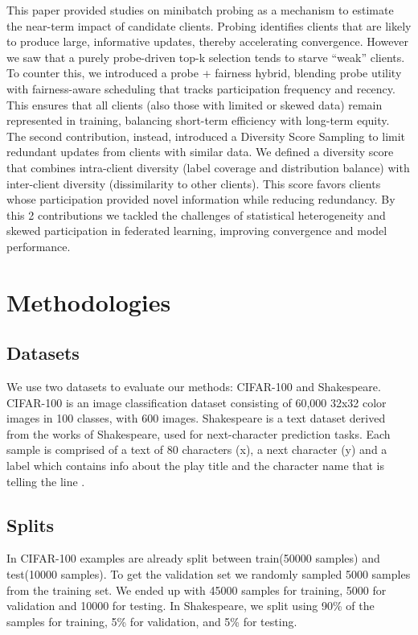\documentclass[10pt,twocolumn,letterpaper]{article}
\begin{document}
This paper provided studies on minibatch probing as a mechanism to estimate the near-term impact of candidate clients. Probing identifies clients that are likely to produce large, informative updates, thereby accelerating convergence. However we saw that a purely probe-driven top-k selection tends to starve “weak” clients. To counter this, we introduced a probe + fairness hybrid, blending probe utility with fairness-aware scheduling that tracks participation frequency and recency. This ensures that all clients (also those with limited or skewed data) remain represented in training, balancing short-term efficiency with long-term equity.
The second contribution, instead, introduced a Diversity Score Sampling to limit redundant updates from clients with similar data. We defined a diversity score that combines intra-client diversity (label coverage and distribution balance) with inter-client diversity (dissimilarity to other clients). This score favors clients whose participation provided novel information while reducing redundancy.
By this 2 contributions we tackled the challenges of statistical heterogeneity and skewed participation in federated learning, improving convergence and model performance.




\section{Methodologies}
\label{sec:formatting} 
\subsection{Datasets}
We use two datasets to evaluate our methods: CIFAR-100 and Shakespeare.
CIFAR-100 \cite{Cifar} is an image classification dataset consisting of 60,000 32x32 color images in 100 classes, with 600 images.
Shakespeare \cite{Shakespeare} is a text dataset derived from the works of Shakespeare, used for next-character prediction tasks. Each sample is comprised of a text of 80 characters (x), a next character (y) and a label which contains info about the play title and the character name that is telling the line .
\subsection{Splits}
In CIFAR-100 examples are already split between train(50000 samples) and test(10000 samples). To get the validation set we randomly sampled 5000 samples from the training set.
 We ended up with 45000 samples for training, 5000 for validation and 10000 for testing.
In Shakespeare, we split using 90\% of the samples for training, 5\% for validation, and 5\% for testing.  
\end{document}
